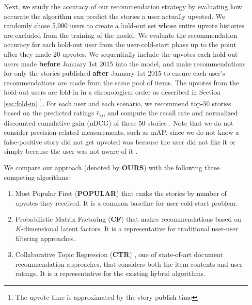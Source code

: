 \documentclass[conference]{IEEEtran}
\begin{document}
Next, we study the accuracy of our recommendation strategy by evaluating how accurate the algorithm can predict the stories a user actually upvoted.  We randomly chose 5,000 users to create a hold-out set whose entire upvote histories are excluded from the training of the model. We evaluate the recommendation accuracy for each hold-out user from the user-cold-start phase up to the point after they made 20 upvotes. We sequentially include the upvotes each hold-out users made \textbf{before} January 1st 2015 into the model, and make recommendations for only the stories published \textbf{after} January 1st 2015 to ensure each user's recommendations are made from the same pool of items. The upvotes from the hold-out users are fold-in in a chronological order as described in Section \ref{sec:fold-in} \footnote{The upvote time is approximated by the story publish time}. For each user and each scenario, we recommend top-50 stories based on the predicted ratings $\hat{r}_{ij}$, and compute the recall rate and normalized discounted cumulative gain (nDCG) of these 50 stories \cite{weimer2007maximum}. Note that we do not consider precision-related measurements, such as mAP, since we do not know a false-positive story did not get upvoted was because the user did not like it or simply because the user was not aware of it \cite{wang2011collaborative}. 

We compare our approach (denoted by \textbf{OURS}) with the following three competing algorithms: 
\begin{enumerate}
\item Most Popular First (\textbf{POPULAR}) that ranks the stories by number of upvotes they received. It is a common baseline for user-cold-start problem.


\item Probabilistic Matrix Factoring (\textbf{CF}) that makes recommendations based on $K$-dimensional latent factors. It is a representative for traditional user-user filtering approaches.

\item Collaborative Topic Regression (\textbf{CTR}) \cite{wang2011collaborative}, one of state-of-art document recommendation approaches, that considers both the item contents and user ratings. It is a representative for the existing hybrid algorithms. 
\end{enumerate}
\end{document}
